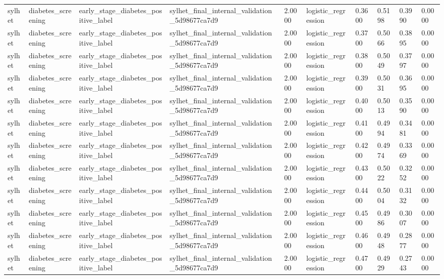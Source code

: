 \begin{tabular}{llllllllll}
sylhet & diabetes\_screening & early\_stage\_diabetes\_positive\_label & sylhet\_final\_internal\_validation\_5d98677ca7d9 & 2.0000 & logistic\_regression & 0.3600 & 0.5198 & 0.3990 & 0.0000 \\
sylhet & diabetes\_screening & early\_stage\_diabetes\_positive\_label & sylhet\_final\_internal\_validation\_5d98677ca7d9 & 2.0000 & logistic\_regression & 0.3700 & 0.5066 & 0.3895 & 0.0000 \\
sylhet & diabetes\_screening & early\_stage\_diabetes\_positive\_label & sylhet\_final\_internal\_validation\_5d98677ca7d9 & 2.0000 & logistic\_regression & 0.3800 & 0.5049 & 0.3797 & 0.0000 \\
sylhet & diabetes\_screening & early\_stage\_diabetes\_positive\_label & sylhet\_final\_internal\_validation\_5d98677ca7d9 & 2.0000 & logistic\_regression & 0.3900 & 0.5031 & 0.3695 & 0.0000 \\
sylhet & diabetes\_screening & early\_stage\_diabetes\_positive\_label & sylhet\_final\_internal\_validation\_5d98677ca7d9 & 2.0000 & logistic\_regression & 0.4000 & 0.5013 & 0.3590 & 0.0000 \\
sylhet & diabetes\_screening & early\_stage\_diabetes\_positive\_label & sylhet\_final\_internal\_validation\_5d98677ca7d9 & 2.0000 & logistic\_regression & 0.4100 & 0.4994 & 0.3481 & 0.0000 \\
sylhet & diabetes\_screening & early\_stage\_diabetes\_positive\_label & sylhet\_final\_internal\_validation\_5d98677ca7d9 & 2.0000 & logistic\_regression & 0.4200 & 0.4974 & 0.3369 & 0.0000 \\
sylhet & diabetes\_screening & early\_stage\_diabetes\_positive\_label & sylhet\_final\_internal\_validation\_5d98677ca7d9 & 2.0000 & logistic\_regression & 0.4300 & 0.5022 & 0.3252 & 0.0000 \\
sylhet & diabetes\_screening & early\_stage\_diabetes\_positive\_label & sylhet\_final\_internal\_validation\_5d98677ca7d9 & 2.0000 & logistic\_regression & 0.4400 & 0.5004 & 0.3132 & 0.0000 \\
sylhet & diabetes\_screening & early\_stage\_diabetes\_positive\_label & sylhet\_final\_internal\_validation\_5d98677ca7d9 & 2.0000 & logistic\_regression & 0.4500 & 0.4986 & 0.3007 & 0.0000 \\
sylhet & diabetes\_screening & early\_stage\_diabetes\_positive\_label & sylhet\_final\_internal\_validation\_5d98677ca7d9 & 2.0000 & logistic\_regression & 0.4600 & 0.4948 & 0.2877 & 0.0000 \\
sylhet & diabetes\_screening & early\_stage\_diabetes\_positive\_label & sylhet\_final\_internal\_validation\_5d98677ca7d9 & 2.0000 & logistic\_regression & 0.4700 & 0.4929 & 0.2743 & 0.0000 \\

\end{tabular}
